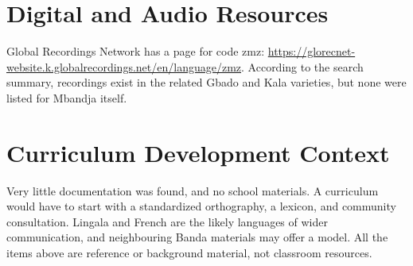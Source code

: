 \documentclass[12pt]{article}
\begin{document}
\section{Digital and Audio Resources}
Global Recordings Network has a page for code zmz: \url{https://glorecnet-website.k.globalrecordings.net/en/language/zmz}. According to the search summary, recordings exist in the related Gbado and Kala varieties, but none were listed for Mbandja itself.

\section{Curriculum Development Context}
Very little documentation was found, and no school materials. A curriculum would have to start with a standardized orthography, a lexicon, and community consultation. Lingala and French are the likely languages of wider communication, and neighbouring Banda materials may offer a model. All the items above are reference or background material, not classroom resources.
\end{document}
